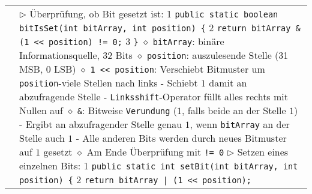 \begin{longtable}{ | p{} p{} | }
	\makecell[l]{Bitlogik} & \makecell[l]{
	$\triangleright$ Überprüfung, ob Bit gesetzt ist: \\
	\hspace{0.4cm} 1 \hspace{0.1cm} \texttt{public static boolean bitIsSet(int bitArray, int position) \{} \\
	\hspace{0.4cm} 2 \hspace{0.5cm} \texttt{return bitArray \& (1 << position) != 0;} \\
	\hspace{0.4cm} 3 \hspace{0.1cm} \texttt{\}} \\
	\hspace{0.4cm} $\diamond$ \texttt{bitArray}: binäre Informationsquelle, 32 Bits \\
	\hspace{0.4cm} $\diamond$ \texttt{position}: auszulesende Stelle (31 MSB, 0 LSB) \\
	\hspace{0.4cm} $\diamond$ \texttt{1 << position}: Verschiebt Bitmuster um \texttt{position}-viele Stellen nach links \\
	\hspace{0.6cm} - Schiebt $1$ damit an abzufragende Stelle \\
	\hspace{0.6cm} - \texttt{Linksshift}-Operator füllt alles rechts mit Nullen auf \\
	\hspace{0.4cm} $\diamond$ \texttt{\&}: Bitweise \texttt{Verundung} ($1$, falls beide an der Stelle $1$) \\
	\hspace{0.6cm} - Ergibt an abzufragender Stelle genau $1$, wenn \texttt{bitArray} an der Stelle auch $1$ \\
	\hspace{0.6cm} - Alle anderen Bits werden durch neues Bitmuster auf $1$ gesetzt  \\
	\hspace{0.4cm} $\diamond$ Am Ende Überprüfung mit \texttt{!= 0} \\
	$\triangleright$ Setzen eines einzelnen Bits: \\
	\hspace{0.4cm} 1 \hspace{0.1cm} \texttt{public static int setBit(int bitArray, int position) \{} \\
	\hspace{0.4cm} 2 \hspace{0.5cm} \texttt{return bitArray | (1 << position);} \\
}
\end{longtable}
